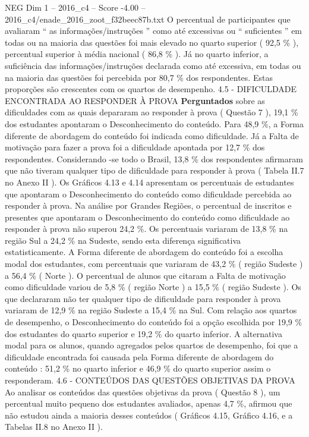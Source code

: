 \begin{textsample}{NEG Dim 1 – 2016\_c4 – Score -4.00 – 2016\_c4/enade\_2016\_zoot\_f32beec87b.txt}
O percentual de participantes que avaliaram “ as informações/instruções ” como até excessivas ou “ suficientes ” em todas ou na maioria das questões foi mais elevado no quarto superior ( 92,5 \% ), percentual superior à média nacional ( 86,8 \% ).
Já no quarto inferior, a suficiência das informações/instruções declarada como até excessiva, em todas ou na maioria das questões foi percebida por 80,7 \% dos respondentes.
Estas proporções são crescentes com os quartos de desempenho. 4.5 - DIFICULDADE ENCONTRADA AO RESPONDER À PROVA \textbf{Perguntados} sobre as dificuldades com as quais depararam ao responder à prova ( Questão 7 ), 19,1 \% dos estudantes apontaram o Desconhecimento do conteúdo.
Para 48,9 \%, a Forma diferente de abordagem do conteúdo foi indicada como dificuldade.
Já a Falta de motivação para fazer a prova foi a dificuldade apontada por 12,7 \% dos respondentes.
Considerando -se todo o Brasil, 13,8 \% dos respondentes afirmaram que não tiveram qualquer tipo de dificuldade para responder à prova ( Tabela II.7 no Anexo II ).
Os Gráficos 4.13 e 4.14 apresentam os percentuais de estudantes que apontaram o Desconhecimento do conteúdo como dificuldade percebida ao responder à prova.
Na análise por Grandes Regiões, o percentual de inscritos e presentes que apontaram o Desconhecimento do conteúdo como dificuldade ao responder à prova não superou 24,2 \%.
Os percentuais variaram de 13,8 \% na região Sul a 24,2 \% na Sudeste, sendo esta diferença significativa estatisticamente.
A Forma diferente de abordagem do conteúdo foi a escolha modal dos estudantes, com percentuais que variaram de 43,2 \% ( região Sudeste ) a 56,4 \% ( Norte ).
O percentual de alunos que citaram a Falta de motivação como dificuldade variou de 5,8 \% ( região Norte ) a 15,5 \% ( região Sudeste ).
Os que declararam não ter qualquer tipo de dificuldade para responder à prova variaram de 12,9 \% na região Sudeste a 15,4 \% na Sul.
Com relação aos quartos de desempenho, o Desconhecimento do conteúdo foi a opção escolhida por 19,9 \% dos estudantes do quarto superior e 19,2 \% do quarto inferior.
A alternativa modal para os alunos, quando agregados pelos quartos de desempenho, foi que a dificuldade encontrada foi causada pela Forma diferente de abordagem do conteúdo : 51,2 \% no quarto inferior e 46,9 \% do quarto superior assim o responderam. 4.6 - CONTEÚDOS DAS QUESTÕES OBJETIVAS DA PROVA Ao analisar os conteúdos das questões objetivas da prova ( Questão 8 ), um percentual muito pequeno dos estudantes avaliados, apenas 4,7 \%, afirmou que não estudou ainda a maioria desses conteúdos ( Gráficos 4.15, Gráfico 4.16, e a Tabelas II.8 no Anexo II ).

\end{textsample}
